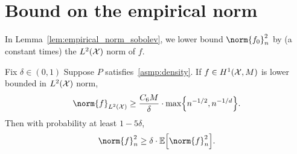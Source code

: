 \section{Bound on the empirical norm}
\label{sec:empirical_norm}

In Lemma~\ref{lem:empirical_norm_sobolev}, we lower bound $\norm{f_0}_n^2$ by (a constant times) the $L^2(\mathcal{X})$ norm of $f$.

\begin{lemma}
	\label{lem:empirical_norm_sobolev}
	Fix $\delta \in (0,1)$ Suppose $P$ satisfies~\ref{asmp:density}. If $f \in H^1(\mathcal{X},M)$ is lower bounded in $L^2(\mathcal{X})$ norm,
	\begin{equation}
	\label{eqn:empirical_norm_sobolev_1}
	\norm{f}_{\Leb^2(\Xset)} \geq \frac{C_6 M}{\delta} \cdot \max\Bigl\{n^{-1/2},n^{-1/d}\Bigr\}.
	\end{equation}
	Then with probability at least $1 - 5 \delta$,
	\begin{equation}
	\label{eqn:empirical_norm_sobolev}
	\norm{f}_n^2 \geq \delta \cdot \Ebb\Bigl[\norm{f}_n^2\Bigr].
	\end{equation}
\end{lemma}

